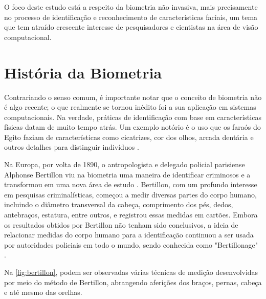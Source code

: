 O foco deste estudo está a respeito da biometria não invasiva, mais 
precisamente no processo de identificação e reconhecimento de 
características faciais, um tema que tem atraído crescente 
interesse de pesquisadores e cientistas na área de visão 
computacional.

\section{História da Biometria}\label{sec:histbiometria}

Contrariando o senso comum, é importante notar que o conceito de biometria 
não é algo recente; o que realmente se tornou inédito foi a sua aplicação 
em sistemas computacionais. Na verdade, práticas de identificação com base 
em características físicas datam de muito tempo atrás. Um exemplo notório 
é o uso que os faraós do Egito faziam de características como cicatrizes, 
cor dos olhos, arcada dentária e outros detalhes para distinguir 
indivíduos \cite{boechat2008}.

Na Europa, por volta de 1890, o antropologista e delegado policial 
parisiense Alphonse Bertillon viu na biometria uma maneira de identificar 
criminosos e a transformou em uma nova área de estudo \cite{moraes2006}. 
Bertillon, com um profundo interesse em pesquisas criminalísticas, 
começou a medir diversas partes do corpo humano, incluindo o diâmetro 
transversal da cabeça, comprimento dos pés, dedos, antebraços, estatura, 
entre outros, e registrou essas medidas em cartões. Embora os resultados 
obtidos por Bertillon não tenham sido conclusivos, a ideia de relacionar 
medidas do corpo humano para a identificação continuou a ser usada 
por autoridades policiais em todo o mundo, sendo conhecida como 
"Bertillonage" \cite{boechat2008}.

Na \autoref{fig:bertillon}, podem ser observadas várias técnicas de medição 
desenvolvidas por meio do método de Bertillon, abrangendo aferições dos 
braços, pernas, cabeça e até mesmo das orelhas.

